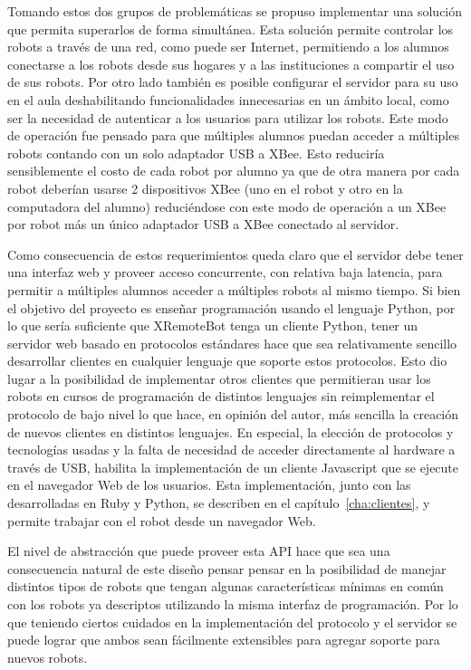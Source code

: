 Tomando estos dos grupos de problemáticas se propuso implementar una solución
que permita
superarlos de forma simultánea. Esta solución permite controlar los
robots a través de una red, como puede ser Internet, permitiendo a los alumnos
conectarse a los robots desde sus hogares y a las instituciones a compartir
el uso de sus robots. Por otro lado también es posible configurar el servidor
para su uso en el aula deshabilitando funcionalidades innecesarias en un ámbito
local, como ser la necesidad de autenticar a los usuarios para utilizar los
robots. Este modo de operación fue pensado para que múltiples alumnos puedan
acceder a múltiples robots contando con un solo adaptador USB a XBee. Esto
reduciría sensiblemente el costo de cada robot por alumno ya que de otra
manera por cada robot deberían usarse 2 dispositivos XBee (uno en el robot
y otro en la computadora del alumno) reduciéndose con este modo de operación
a un XBee por robot más un único adaptador USB a XBee conectado al servidor.

Como consecuencia de estos requerimientos queda claro que el servidor
debe tener una interfaz web y proveer acceso concurrente, con relativa
baja latencia, para permitir a múltiples alumnos acceder a múltiples robots
al mismo tiempo. Si bien el objetivo del proyecto \proyecto{} es enseñar
programación usando el lenguaje Python, por lo que sería suficiente
que XRemoteBot tenga un cliente Python, tener un servidor web basado en
protocolos estándares hace que sea relativamente sencillo desarrollar
clientes en cualquier lenguaje
que soporte estos protocolos. Esto dio lugar a la posibilidad de
implementar otros clientes que permitieran usar los robots en cursos
de programación de distintos lenguajes sin reimplementar el protocolo
de bajo nivel lo que hace, en opinión del autor, más sencilla la creación
de nuevos clientes en distintos lenguajes.
En especial, la elección de protocolos y tecnologías usadas
y la falta de necesidad de acceder directamente al hardware a través de USB,
habilita la implementación de un cliente Javascript que se ejecute en el
navegador Web de los usuarios. Esta implementación, junto con las desarrolladas
en Ruby y Python, se describen en el capítulo~\ref{cha:clientes}, y permite
trabajar con el robot desde un navegador Web.

El nivel de abstracción que puede proveer esta API hace que sea
una consecuencia natural de este diseño pensar
pensar en la posibilidad de manejar distintos tipos de robots
que tengan algunas características mínimas en común con los robots ya
descriptos utilizando la misma interfaz de programación. Por lo que
teniendo ciertos cuidados en la implementación del protocolo y el
servidor se puede lograr que ambos sean fácilmente extensibles para
agregar soporte para nuevos robots.

